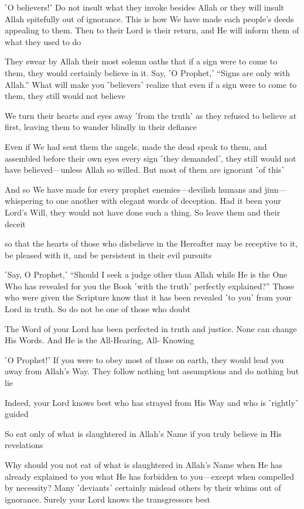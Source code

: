 ˹O believers!˺ Do not insult what they invoke besides Allah or they will insult Allah spitefully out of ignorance. This is how We have made each people’s deeds appealing to them. Then to their Lord is their return, and He will inform them of what they used to do

They swear by Allah their most solemn oaths that if a sign were to come to them, they would certainly believe in it. Say, ˹O Prophet,˺ “Signs are only with Allah.” What will make you ˹believers˺ realize that even if a sign were to come to them, they still would not believe

We turn their hearts and eyes away ˹from the truth˺ as they refused to believe at first, leaving them to wander blindly in their defiance

Even if We had sent them the angels, made the dead speak to them, and assembled before their own eyes every sign ˹they demanded˺, they still would not have believed—unless Allah so willed. But most of them are ignorant ˹of this˺

And so We have made for every prophet enemies—devilish humans and jinn—whispering to one another with elegant words of deception. Had it been your Lord’s Will, they would not have done such a thing. So leave them and their deceit

so that the hearts of those who disbelieve in the Hereafter may be receptive to it, be pleased with it, and be persistent in their evil pursuits

˹Say, O Prophet,˺ “Should I seek a judge other than Allah while He is the One Who has revealed for you the Book ˹with the truth˺ perfectly explained?” Those who were given the Scripture know that it has been revealed ˹to you˺ from your Lord in truth. So do not be one of those who doubt

The Word of your Lord has been perfected in truth and justice. None can change His Words. And He is the All-Hearing, All- Knowing

˹O Prophet!˺ If you were to obey most of those on earth, they would lead you away from Allah’s Way. They follow nothing but assumptions and do nothing but lie

Indeed, your Lord knows best who has strayed from His Way and who is ˹rightly˺ guided

So eat only of what is slaughtered in Allah’s Name if you truly believe in His revelations

Why should you not eat of what is slaughtered in Allah’s Name when He has already explained to you what He has forbidden to you—except when compelled by necessity? Many ˹deviants˺ certainly mislead others by their whims out of ignorance. Surely your Lord knows the transgressors best

